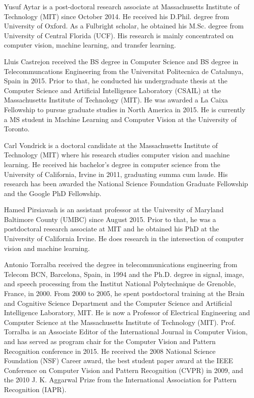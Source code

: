 \documentclass[10pt,journal,compsoc]{IEEEtran}
\begin{document}
\begin{IEEEbiographynophoto}{Yusuf Aytar} is a post-doctoral research associate at Massachusetts Institute of Technology (MIT) since October 2014. He received his D.Phil. degree from University of Oxford. As a Fulbright scholar, he obtained his M.Sc. degree from University of Central Florida (UCF). His research is mainly concentrated on computer vision, machine learning, and transfer learning.\end{IEEEbiographynophoto} \begin{IEEEbiographynophoto}{Lluis Castrejon} received the BS degree in Computer Science and BS degree in Telecommuncations Engineering from the Universitat Politecnica de Catalunya, Spain in 2015. Prior to that, he conducted his undergraduate thesis at the Computer Science and Artificial Intelligence Laboratory (CSAIL) at the Massachusetts Institute of Technology (MIT). He was awarded a La Caixa Fellowship to pursue graduate studies in North America in 2015. He is currently a MS student in Machine Learning and Computer Vision at the University of Toronto.\end{IEEEbiographynophoto}\begin{IEEEbiographynophoto}{Carl Vondrick}
is a doctoral candidate at the Massachusetts Institute of Technology (MIT) where his research studies computer vision and machine learning. He received his bachelor’s degree in computer science from the University of California, Irvine in 2011, graduating summa cum laude. His research has been awarded the National Science Foundation Graduate Fellowship and the Google PhD Fellowship. \end{IEEEbiographynophoto}\begin{IEEEbiographynophoto}{Hamed Pirsiavash} is an assistant professor at the University of Maryland Baltimore County (UMBC) since August 2015. Prior to that, he was a postdoctoral research associate at MIT and he obtained his PhD at the University of California Irvine. He does research in the intersection of computer vision and machine learning.\end{IEEEbiographynophoto}\begin{IEEEbiographynophoto}{Antonio Torralba} received the degree in telecommunications engineering from Telecom BCN, Barcelona, Spain, in 1994 and the Ph.D. degree in signal, image, and speech processing from the Institut National Polytechnique de Grenoble, France, in 2000. From 2000 to 2005, he spent postdoctoral training at the Brain and Cognitive Science Department and the Computer Science and Artificial Intelligence Laboratory, MIT. He is now a Professor of Electrical Engineering and Computer Science at the Massachusetts Institute of Technology (MIT). Prof. Torralba is an Associate Editor of the International Journal in Computer Vision, and has served as program chair for the Computer Vision and Pattern Recognition conference in 2015. He received the 2008 National Science Foundation (NSF) Career award, the best student paper award at the IEEE Conference on Computer Vision and Pattern Recognition (CVPR) in 2009, and the 2010 J. K. Aggarwal Prize from the International Association for Pattern Recognition (IAPR). 
\end{IEEEbiographynophoto}

\vfill
\end{document}

